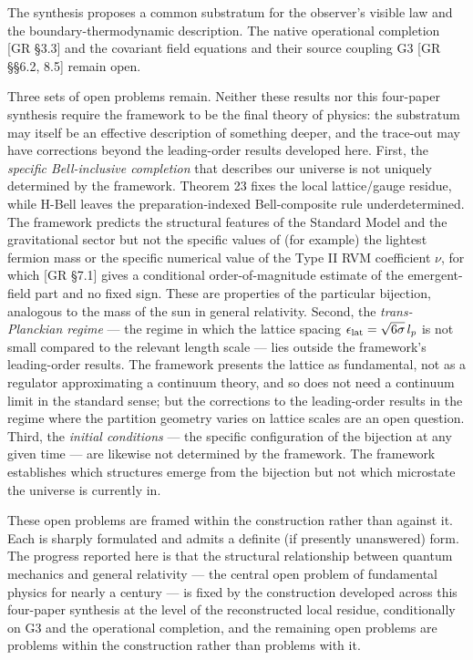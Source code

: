 \documentclass[
]{article}
\begin{document}
The synthesis proposes a common substratum for the observer's visible
law and the boundary-thermodynamic description. The native operational
completion {[}GR §3.3{]} and the covariant field equations and their
source coupling G3 {[}GR §§6.2, 8.5{]} remain open.

Three sets of open problems remain. Neither these results nor this
four-paper synthesis require the framework to be the final theory of
physics: the substratum may itself be an effective description of
something deeper, and the trace-out may have corrections beyond the
leading-order results developed here. First, the \emph{specific
Bell-inclusive completion} that describes our universe is not uniquely
determined by the framework. Theorem 23 fixes the local lattice/gauge
residue, while H-Bell leaves the preparation-indexed Bell-composite rule
underdetermined. The framework predicts the structural features of the
Standard Model and the gravitational sector but not the specific values
of (for example) the lightest fermion mass or the specific numerical
value of the Type II RVM coefficient \(\nu\), for which {[}GR §7.1{]}
gives a conditional order-of-magnitude estimate of the emergent-field
part and no fixed sign. These are properties of the particular
bijection, analogous to the mass of the sun in general relativity.
Second, the \emph{trans-Planckian regime} --- the regime in which the
lattice spacing \(\epsilon_{\rm lat} = \sqrt{6\sigma}\,l_p\) is not
small compared to the relevant length scale --- lies outside the
framework's leading-order results. The framework presents the lattice as
fundamental, not as a regulator approximating a continuum theory, and so
does not need a continuum limit in the standard sense; but the
corrections to the leading-order results in the regime where the
partition geometry varies on lattice scales are an open question. Third,
the \emph{initial conditions} --- the specific configuration of the
bijection at any given time --- are likewise not determined by the
framework. The framework establishes which structures emerge from the
bijection but not which microstate the universe is currently in.

These open problems are framed within the construction rather than
against it. Each is sharply formulated and admits a definite (if
presently unanswered) form. The progress reported here is that the
structural relationship between quantum mechanics and general relativity
--- the central open problem of fundamental physics for nearly a century
--- is fixed by the construction developed across this four-paper
synthesis at the level of the reconstructed local residue, conditionally
on G3 and the operational completion, and the remaining open problems
are problems within the construction rather than problems with it.
\end{document}
